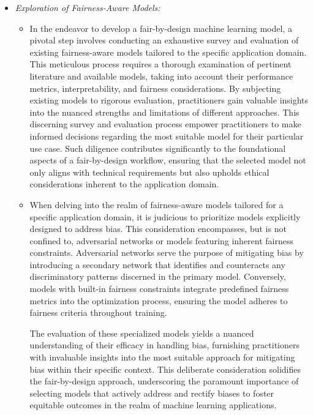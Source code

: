 \documentclass[12pt,a4paper,openright,twoside]{book}
\begin{document}
\begin{itemize}

    \item \emph{Exploration of Fairness-Aware Models:}
     
    \begin{itemize}
    
        \item In the endeavor to develop a fair-by-design machine learning model, a pivotal step involves conducting an exhaustive survey and evaluation of existing fairness-aware models tailored to the specific application domain. This meticulous process requires a thorough examination of pertinent literature and available models, taking into account their performance metrics, interpretability, and fairness considerations. By subjecting existing models to rigorous evaluation, practitioners gain valuable insights into the nuanced strengths and limitations of different approaches. This discerning survey and evaluation process empower practitioners to make informed decisions regarding the most suitable model for their particular use case. Such diligence contributes significantly to the foundational aspects of a fair-by-design workflow, ensuring that the selected model not only aligns with technical requirements but also upholds ethical considerations inherent to the application domain.
    
        \item When delving into the realm of fairness-aware models tailored for a specific application domain, it is judicious to prioritize models explicitly designed to address bias. This consideration encompasses, but is not confined to, adversarial networks or models featuring inherent fairness constraints. Adversarial networks serve the purpose of mitigating bias by introducing a secondary network that identifies and counteracts any discriminatory patterns discerned in the primary model. Conversely, models with built-in fairness constraints integrate predefined fairness metrics into the optimization process, ensuring the model adheres to fairness criteria throughout training.

        The evaluation of these specialized models yields a nuanced understanding of their efficacy in handling bias, furnishing practitioners with invaluable insights into the most suitable approach for mitigating bias within their specific context. This deliberate consideration solidifies the fair-by-design approach, underscoring the paramount importance of selecting models that actively address and rectify biases to foster equitable outcomes in the realm of machine learning applications.    
    

\end{itemize}
\end{itemize}
\end{document}
